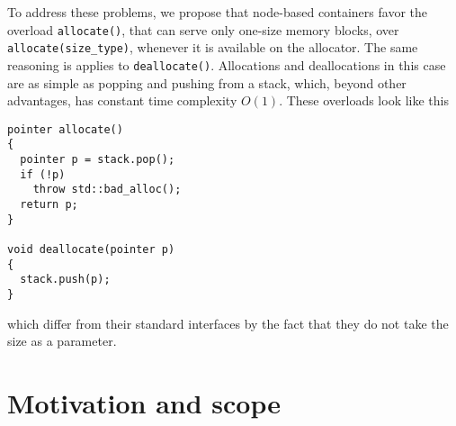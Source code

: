 \documentclass[11pt]{article}
\begin{document}
To address these problems, we propose that node-based containers favor
the overload \texttt{allocate()}, that can serve only one-size
memory blocks, over \texttt{allocate(size\_type)}, whenever it is
available on the allocator.  The same reasoning is applies to \texttt{deallocate()}.
Allocations and deallocations in this case are as simple as popping and pushing
from a stack, which, beyond other advantages, has constant time complexity
$O(1)$.  These overloads look like this

\medskip
\begin{lstlisting}
pointer allocate()
{
  pointer p = stack.pop(); 
  if (!p)
    throw std::bad_alloc();
  return p; 
}

void deallocate(pointer p)
{
  stack.push(p);
}
\end{lstlisting}
which differ from their standard interfaces by the fact
that they do not take the size as a parameter.

\section{Motivation and scope}
\end{document}
